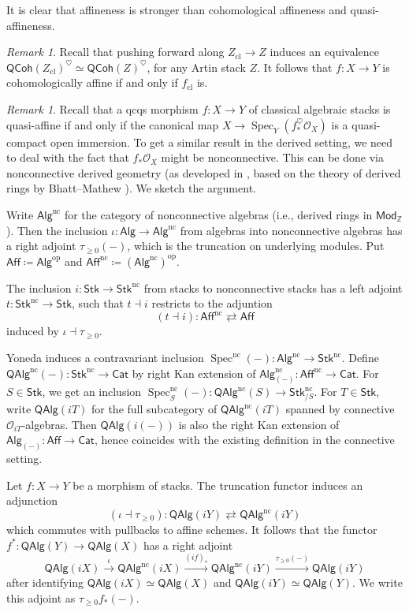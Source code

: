\documentclass[a4paper,twoside,11pt]{amsart}
\theoremstyle{plain}
\theoremstyle{definition}
\theoremstyle{remark}
\newtheorem{remark}[theorem]{Remark}
\numberwithin{equation}{section}
\newcommand{\ZZ}{\mathbb{Z}} %
\newcommand{\nc}{\mathrm{nc}}
\newcommand{\op}{\mathrm{op}}
\newcommand{\QAlg}{\mathsf{QAlg}}
\newcommand{\Stk}{\mathsf{Stk}}
\newcommand\Mod{\mathsf{Mod}}
\newcommand\Cat{\mathsf{Cat}}
\newcommand{\Alg}{\mathsf{Alg}}
\newcommand{\Aff}{\mathsf{Aff}}
\DeclareMathOperator{\Spec}{Spec} %
\newcommand{\QCoh}{\mathsf{QCoh}}
\newcommand{\cl}{\mathrm{cl}} %
\newcommand{\oO}{\mathcal{O}}
\begin{document}
It is clear that affineness is stronger than cohomological affineness and quasi-affineness. 

\begin{remark}
\label{Rem:coh_aff_cl}
    Recall that pushing forward along $Z_\cl \to Z$ induces an equivalence $\QCoh(Z_\cl)^\heartsuit \simeq \QCoh(Z)^{\heartsuit}$, for any Artin stack $Z$. It follows that $f \colon X \to Y$ is cohomologically affine if and only if $f_\cl$ is.
\end{remark}

\begin{remark}
\label{Rem:noncon_push}
Recall that a qcqs morphism $f \colon X \to Y$ of classical algebraic stacks is quasi-affine if and only if the canonical map $X \to \Spec_Y(f^{\heartsuit}_*\oO_X)$ is a quasi-compact open immersion. To get a similar result in the derived setting, we need to deal with the fact that $f_*\oO_X$ might be nonconnective. This can be done via nonconnective derived geometry (as developed in \cite{BenBassatHekkingBlowups}, based on the theory of derived rings by Bhatt--Mathew \cite{RaksitHKR}). We sketch the argument.

Write $\Alg^{\nc}$ for the category of nonconnective algebras (i.e., derived rings in $\Mod_\ZZ$). Then the inclusion $\iota \colon \Alg \to \Alg^{\nc}$ from algebras into nonconnective algebras has a right adjoint $\tau_{\geq 0}(-)$, which is the truncation on underlying modules. Put $\Aff \coloneqq \Alg^{\op}$ and $\Aff^\nc \coloneqq (\Alg^{\nc})^{\op}$.

The inclusion $i \colon \Stk \to \Stk^{\nc}$ from stacks to nonconnective stacks has a left adjoint $t \colon \Stk^{\nc} \to \Stk$, such that $t \dashv i$ restricts to the adjuntion
\[ (t \dashv i) \colon \Aff^\nc \rightleftarrows \Aff  \]
induced by $\iota \dashv \tau_{\geq 0}$.

Yoneda induces a contravariant inclusion $\Spec^\nc(-) \colon \Alg^\nc \to \Stk^\nc$. Define $\QAlg^\nc(-) \colon \Stk^\nc \to \Cat$ by right Kan extension of $\Alg^\nc_{(-)} \colon \Aff^\nc \to \Cat$. For $S \in \Stk$, we get an inclusion $\Spec^\nc_S(-) \colon \QAlg^\nc(S) \to \Stk^\nc_{/S}$. For $T \in \Stk$, write $\QAlg(iT)$ for the full subcategory of $\QAlg^\nc(iT)$ spanned by connective $\oO_{iT}$-algebras. Then $\QAlg(i(-))$ is also the right Kan extension of $\Alg_{(-)} \colon \Aff \to \Cat$, hence coincides with the existing definition in the connective setting.

Let $f \colon X \to Y$ be a morphism of stacks. The truncation functor induces an adjunction
\[ (\iota \dashv \tau_{\geq 0}) \colon \QAlg(iY) \rightleftarrows \QAlg^\nc(iY) \]
which commutes with pullbacks to affine schemes. It follows that the functor $f^* \colon \QAlg(Y) \to \QAlg(X)$ has a right adjoint
\[ \QAlg(iX) \xrightarrow{\iota} \QAlg^\nc(iX) \xrightarrow{(if)_*} \QAlg^\nc(iY) \xrightarrow{\tau_{\geq 0}(-)} \QAlg(iY) \]
after identifying $\QAlg(iX) \simeq \QAlg(X)$ and $\QAlg(iY) \simeq \QAlg(Y)$. We write this adjoint as $\tau_{\geq 0}f_*(-)$.


\end{remark}
\end{document}
